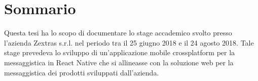 \cleardoublepage
{}
\section*{Sommario}
Questa tesi ha lo scopo di documentare lo stage accademico svolto presso
 l'azienda Zextras s.r.l. nel periodo tra il 25 giugno 2018 e il 24 agosto 2018. 
 Tale stage prevedeva lo sviluppo di un'applicazione mobile crossplatform per la 
 messaggistica in React Native che si allineasse con la soluzione web per la
 messaggistica dei prodotti sviluppati dall'azienda.

\thispagestyle{empty}



\bigskip
